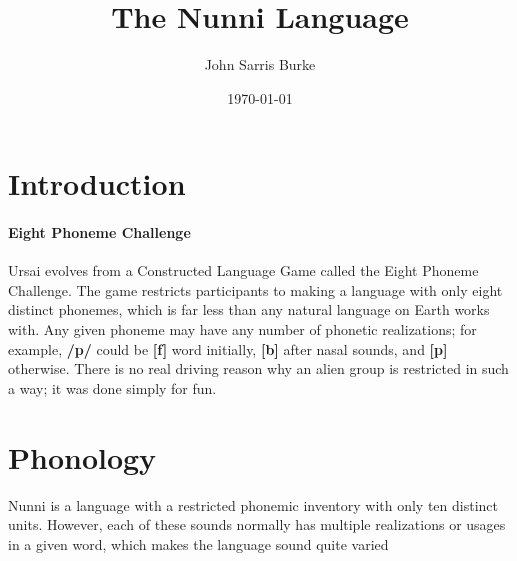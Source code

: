 \documentclass[11pt,letterpaper]{article}
\title{The Nunni Language}
\date{\today}
\author{John Sarris Burke}
\begin{document}
\maketitle
\tableofcontents
\pagebreak
\pagebreak

\section{Introduction}
	\paragraph{Eight Phoneme Challenge}
	Ursai evolves from a Constructed Language Game called the Eight Phoneme Challenge.  The game restricts participants to making a language with only eight distinct phonemes, which is far less than any natural language on Earth works with.  Any given phoneme may have any number of phonetic realizations; for example, \textbf{/p/} could be \textbf{[f]} word initially, \textbf{[b]} after nasal sounds, and \textbf{[p]} otherwise.  There is no real driving reason why an alien group is restricted in such a way; it was done simply for fun.

\pagebreak
\section{Phonology}
  Nunni is a language with a restricted phonemic inventory with only ten distinct units.  However, each of these sounds normally has multiple realizations or usages in a given word, which makes the language sound quite varied
\end{document}
